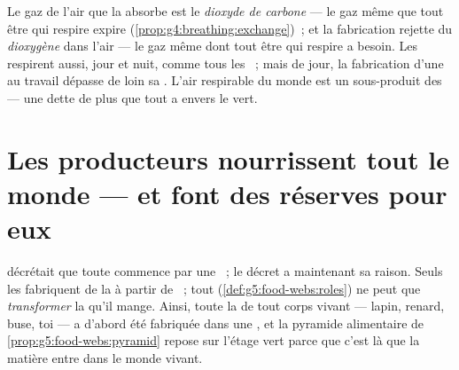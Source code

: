 \begin{remark}\label{rem:g6:plants-are-producers:gas}
Le gaz de l'air que la  absorbe est le \emph{dioxyde de
carbone} --- le gaz même que tout être qui respire expire
(\cref{prop:g4:breathing:exchange})~; et la fabrication rejette du
\emph{dioxygène} dans l'air --- le gaz même dont tout être qui
respire a besoin. Les  respirent aussi, jour et nuit, comme
tous les ~; mais de jour, la fabrication d'une 
au travail dépasse de loin sa . L'air respirable du monde
est un sous-produit des  --- une dette de plus que tout
 a envers le vert.
\end{remark}

\section{Les producteurs nourrissent tout le monde --- et font des réserves pour eux}

\begin{proposition}\label{prop:g6:plants-are-producers:firstlink}
 décrétait que toute  commence par une ~; le décret a maintenant sa
raison. Seuls les  fabriquent de la  à
partir de ~; tout 
(\cref{def:g5:food-webs:roles}) ne peut que \emph{transformer} la
 qu'il mange. Ainsi, toute la  de
tout corps vivant --- lapin, renard, buse, toi --- a d'abord été
fabriquée dans une , et la pyramide alimentaire de
\cref{prop:g5:food-webs:pyramid} repose sur l'étage vert parce que
c'est là que la matière entre dans le monde vivant.
\end{proposition}
\admitted

